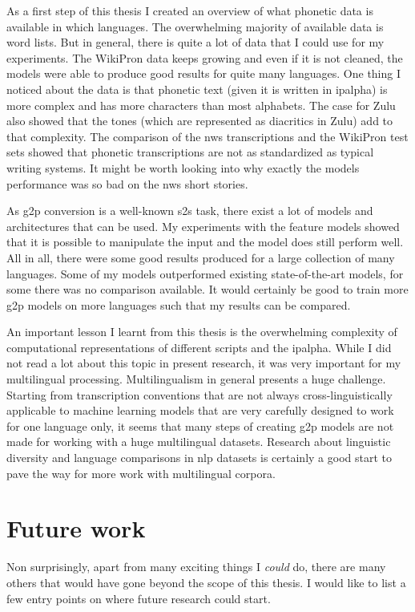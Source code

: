 \label{chap:6_conclusion}
As a first step of this thesis I created an overview of what phonetic data is available in which languages. The overwhelming majority of available data is word lists. But in general, there is quite a lot of data that I could use for my experiments. The WikiPron data keeps growing and even if it is not cleaned, the models were able to produce good results for quite many languages. One thing I noticed about the data is that phonetic text (given it is written in \ac{ipalpha}) is more complex and has more characters than most alphabets. The case for Zulu also showed that the tones (which are represented as diacritics in Zulu) add to that complexity. The comparison of the \ac{nws} transcriptions and the WikiPron test sets showed that phonetic transcriptions are not as standardized as typical writing systems. It might be worth looking into why exactly the models performance was so bad on the \ac{nws} short stories.

As \ac{g2p} conversion is a well-known \ac{s2s} task, there exist a lot of models and architectures that can be used. My experiments with the feature models showed that it is possible to manipulate the input and the model does still perform well. All in all, there were some good results produced for a large collection of many languages. Some of my models outperformed existing state-of-the-art models, for some there was no comparison available. It would certainly be good to train more \ac{g2p} models on more languages such that my results can be compared. 

An important lesson I learnt from this thesis is the overwhelming complexity of computational representations of different scripts and the \ac{ipalpha}. While I did not read a lot about this topic in present research, it was very important for my multilingual processing. Multilingualism in general presents a huge challenge. Starting from transcription conventions that are not always cross-linguistically applicable to machine learning models that are very carefully designed to work for one language only, it seems that many steps of creating \ac{g2p} models are not made for working with a huge multilingual datasets. Research about linguistic diversity and language comparisons in \ac{nlp} datasets is certainly a good start to pave the way for more work with multilingual corpora.

\section*{Future work}
Non surprisingly, apart from many exciting things I \textit{could} do, there are many others that would have gone beyond the scope of this thesis. I would like to list a few entry points on where future research could start. 

